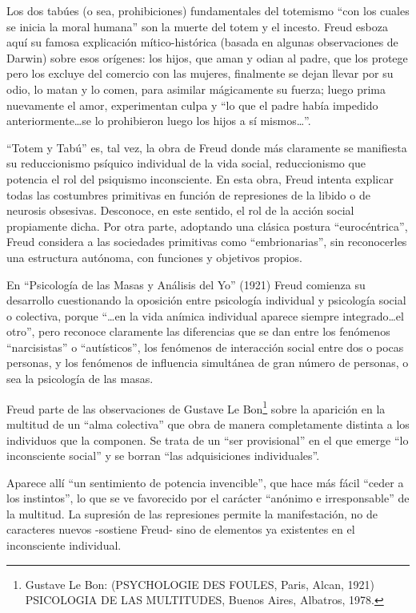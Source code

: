 \documentclass[
]{book}
\begin{document}
Los dos tabúes (o sea, prohibiciones) fundamentales del totemismo ``con los cuales se inicia la moral humana'' son la muerte del totem y el incesto. Freud esboza aquí su famosa explicación mítico-histórica (basada en algunas observaciones de Darwin) sobre esos orígenes: los hijos, que aman y odian al padre, que los protege pero los excluye del comercio con las mujeres, finalmente se dejan llevar por su odio, lo matan y lo comen, para asimilar mágicamente su fuerza; luego prima nuevamente el amor, experimentan culpa y ``lo que el padre había impedido anteriormente\ldots se lo prohibieron luego los hijos a sí mismos\ldots{}''.

``Totem y Tabú'' es, tal vez, la obra de Freud donde más claramente se manifiesta su reduccionismo psíquico individual de la vida social, reduccionismo que potencia el rol del psiquismo inconsciente. En esta obra, Freud intenta explicar todas las costumbres primitivas en función de represiones de la libido o de neurosis obsesivas. Desconoce, en este sentido, el rol de la acción social propiamente dicha. Por otra parte, adoptando una clásica postura ``eurocéntrica'', Freud considera a las sociedades primitivas como ``embrionarias'', sin reconocerles una estructura autónoma, con funciones y objetivos propios.

En ``Psicología de las Masas y Análisis del Yo'' (1921) Freud comienza su desarrollo cuestionando la oposición entre psicología individual y psicología social o colectiva, porque ``\ldots en la vida anímica individual aparece siempre integrado\ldots el otro'', pero reconoce claramente las diferencias que se dan entre los fenómenos ``narcisistas'' o ``autísticos'', los fenómenos de interacción social entre dos o pocas personas, y los fenómenos de influencia simultánea de gran número de personas, o sea la psicología de las masas.

Freud parte de las observaciones de Gustave Le Bon\footnote{Gustave Le Bon: (PSYCHOLOGIE DES FOULES, Paris, Alcan, 1921) PSICOLOGIA DE LAS MULTITUDES, Buenos Aires, Albatros, 1978.} sobre la aparición en la multitud de un ``alma colectiva'' que obra de manera completamente distinta a los individuos que la componen. Se trata de un ``ser provisional'' en el que emerge ``lo inconsciente social'' y se borran ``las adquisiciones individuales''.

Aparece allí ``un sentimiento de potencia invencible'', que hace más fácil ``ceder a los instintos'', lo que se ve favorecido por el carácter ``anónimo e irresponsable'' de la multitud. La supresión de las represiones permite la manifestación, no de caracteres nuevos -sostiene Freud- sino de elementos ya existentes en el inconsciente individual.
\end{document}
